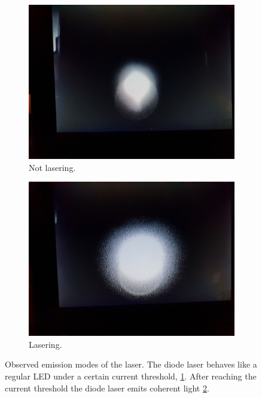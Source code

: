 \begin{figure}
  \centering
      \begin{subfigure}{0.48\textwidth}
          \centering
          \includegraphics[width = \textwidth]{./content/images/diodelaser_not_lasering.jpg}
          \caption{Not lasering.}
          \label{fig:not_lasering}
      \end{subfigure}
      \begin{subfigure}{0.48\textwidth}
          \centering
          \includegraphics[width = \textwidth]{./content/images/diodelaser_lasering.jpg}
          \caption{Lasering.}
          \label{fig:lasering}
      \end{subfigure}
  \caption{Observed emission modes of the laser. The diode laser behaves like a regular
  LED under a certain current threshold, \ref{fig:not_lasering}. After reaching the
  current threshold the diode laser emits coherent light \ref{fig:lasering}. }
\label{fig: emission_modes}
\end{figure}
